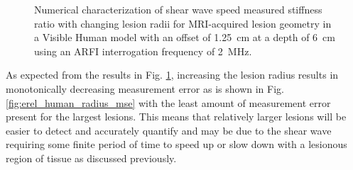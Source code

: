 			\begin{figure}[!htb]
				\centering
				\caption[Numerical characterization of shear wave speed measured stiffness ratio with changing lesion radii in a visible human model]{Numerical characterization of shear wave speed measured stiffness ratio with changing lesion radii for MRI-acquired lesion geometry in a Visible Human model with an offset of \SI{1.25}{\cm} at a depth of \SI{6}{\cm} using an ARFI interrogation frequency of \SI{2}{\MHz}.}
				\label{fig:erel_human_radius}
			\end{figure}

			As expected from the results in Fig. \ref{fig:erel_human_radius}, increasing the lesion radius results in monotonically decreasing measurement error as is shown in Fig. \ref{fig:erel_human_radius_mse} with the least amount of measurement error present for the largest lesions. This means that relatively larger lesions will be easier to detect and accurately quantify and may be due to the shear wave requiring some finite period of time to speed up or slow down with a lesionous region of tissue as discussed previously.

